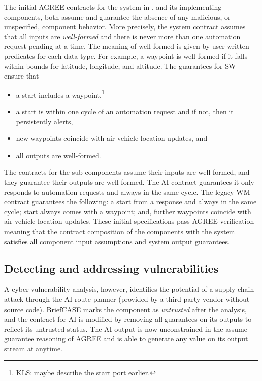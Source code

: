 The initial AGREE contracts for the system in ,
and its implementing components, both assume and guarantee the absence
of any malicious, or unspecified, component behavior.  More precisely,
the system contract assumes that all inputs are \emph{well-formed} and
there is never more than one automation request pending at a time.
The meaning of well-formed is given by user-written predicates for
each data type.  For example, a waypoint is well-formed if it falls
within bounds for latitude, longitude, and altitude.  The guarantees
for SW ensure that
\begin{itemize}
\item a start includes a waypoint,\footnote{KLS: maybe describe the start port earlier.}
\item a start is within one cycle of an automation request and if not, then it persistently alerts,
\item new waypoints coincide with air vehicle location updates, and
\item all outputs are well-formed.
\end{itemize}

The contracts for the sub-components assume their inputs are
well-formed, and they guarantee their outputs are well-formed.  The AI
contract guarantees it only responds to automation requests and always
in the same cycle.  The legacy WM contract guarantees the following: a
start from a response and always in the same cycle; start always comes
with a waypoint; and, further waypoints coincide with air vehicle
location updates.  These initial specifications pass AGREE
verification meaning that the contract composition of the components
with the system satisfies all component input assumptions and system
output guarantees.

\subsection{Detecting and addressing vulnerabilities}
A cyber-vulnerability analysis, however, identifies the potential of a
supply chain attack through the AI route planner (provided by a
third-party vendor without source code).  BriefCASE marks the
component as \emph{untrusted} after the analysis, and the contract for
AI is modified by removing all guarantees on its outputs to reflect
its untrusted status.  The AI output is now unconstrained in the
assume-guarantee reasoning of AGREE and is able to generate any value
on its output stream at anytime.

